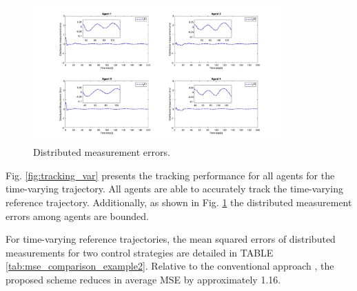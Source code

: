 \documentclass[journal,onecolumn]{IEEEtran}
\begin{document}
\begin{figure}[H]
    \centering
    \includegraphics[width=0.85\textwidth]{var_error.png}
    \caption{Distributed measurement errors.}
    \label{fig:error_var} %
\end{figure}

Fig. \ref{fig:tracking_var} presents the tracking performance for all agents for the time-varying trajectory. All agents are able to accurately track the time-varying reference trajectory. Additionally, as shown in Fig. \ref{fig:error_var} the distributed measurement errors among agents are bounded.

For time-varying reference trajectories, the mean squared errors of distributed
measurements for two control strategies are detailed in TABLE \ref{tab:mse_comparison_example2}. Relative to the
conventional approach \cite{1}, the proposed scheme reduces in average MSE by approximately 1.16.

\begin{table}[H]
    \centering
    \caption{Mean square error comparison (Example 2)}
    \label{tab:mse_comparison_example2}
\end{table}
\end{document}
